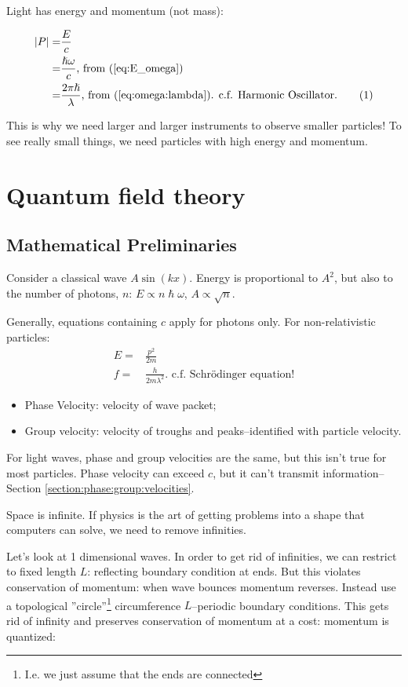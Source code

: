 \documentclass[]{article}
\newcommand\numberthis{\addtocounter{equation}{1}\tag{\theequation}}
\newcommand{\Schr}{{Schr\"odinger }}
\begin{document}
Light has energy and momentum (not mass): 

\begin{align*}
	\left|P\right|=&\frac{E}{c} \\
	=&\frac{\hslash \omega}{c} \text{, from (\ref{eq:E_omega})}\\
	=& \frac{2 \pi \hslash}{\lambda} \text{, from (\ref{eq:omega:lambda}). c.f. Harmonic Oscillator.}\numberthis\label{eq:P:lambda}
\end{align*}

This is why we need larger and larger instruments to observe smaller particles!
To see really small things, we need particles with high energy and momentum.


\section{Quantum field theory}

\subsection{Mathematical Preliminaries}

Consider a classical wave $A \sin(kx)$. Energy is proportional to $A^2$, but also to the number of photons, $n$: $E \propto n \hslash \omega$, $A \propto \sqrt{n}$.

Generally, equations containing $c$ apply for photons only. For non-relativistic particles:
\begin{align*}
	E=&\frac{p^2}{2m}\\
	f =& \frac{h}{2 m \lambda^2} \text{. c.f. \Schr equation!}
\end{align*}

\begin{itemize}
	\item Phase Velocity: velocity of wave packet;
	\item Group velocity: velocity of troughs and peaks--identified with particle velocity.
\end{itemize}

For light waves, phase and group velocities are the same, but this isn't true for most particles. Phase velocity can exceed $c$, but it can't transmit information--Section \ref{section:phase:group:velocities}.

Space is infinite. If physics is the art of getting problems into a shape that computers can solve, we need to remove infinities.

Let's look at 1 dimensional waves. In order to get rid of infinities, we can restrict to fixed length $L$: reflecting boundary condition at ends. But this violates conservation of momentum: when wave bounces momentum reverses. Instead use a topological ''circle''\footnote{I.e. we just assume that the ends are connected} circumference $L$--periodic boundary conditions. This gets rid of infinity and preserves conservation of momentum at a cost: momentum is quantized: 
\end{document}
